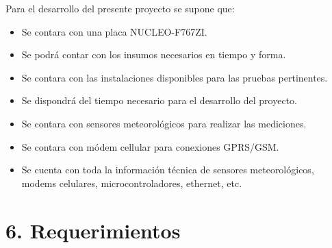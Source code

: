 \documentclass[
11pt, %
codirector, %
]{charter}
\begin{document}
Para el desarrollo del presente proyecto se supone que: 

\begin{itemize}
	\item Se contara con una placa NUCLEO-F767ZI.
	\item Se podrá contar con los insumos necesarios en tiempo y forma.
	\item Se contara con las instalaciones disponibles para las pruebas pertinentes.
	\item Se dispondrá del tiempo necesario para el desarrollo del proyecto.
	\item Se contara con sensores meteorológicos para realizar las mediciones.
	\item Se contara con módem cellular para conexiones GPRS/GSM.
	\item Se cuenta con toda la información técnica de sensores meteorológicos, modems celulares, microcontroladores, ethernet, etc.
\end{itemize}

\section{6. Requerimientos}
\label{sec:requerimientos}
\end{document}
